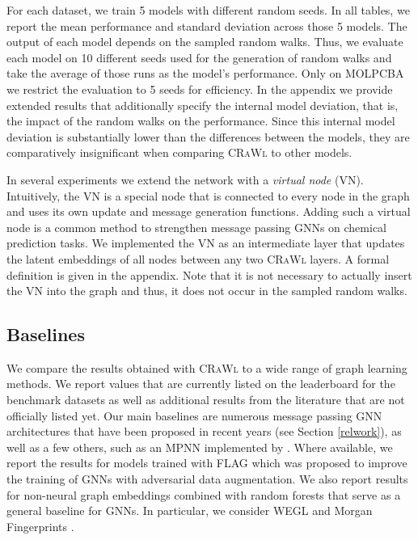 \documentclass{scrartcl} \usepackage[dvipsnames]{xcolor}
\newcommand{\crawl}{\textsc{CRaWl}}
\begin{document}
For each dataset, we train 5 models with different random seeds.
In all tables, we report the mean performance and standard deviation across those 5 models.
The output of each model depends on the sampled random walks.
Thus, we evaluate each model on 10 different seeds used for the generation of random walks and take the average of those runs as the model's performance.
Only on MOLPCBA we restrict the evaluation to 5 seeds for efficiency.
In the appendix we provide extended results that additionally specify the internal model deviation, that is, the impact of the random walks on the performance.
Since this internal model deviation is substantially lower than the differences between the models, they are comparatively insignificant when comparing \crawl{} to other models.




In several experiments we extend the network with a \emph{virtual node} (VN).
Intuitively, the VN is a special node that is connected to every node in the graph and uses its own update and message generation functions.
Adding such a virtual node is a common method to strengthen message passing GNNs on chemical prediction tasks.
We implemented the VN as an intermediate layer that updates the latent embeddings of all nodes between any two \crawl{} layers.
A formal definition is given in the appendix.
Note that it is not necessary to actually insert the VN into the graph and thus, it does not occur in the sampled random walks.


\subsection{Baselines}
We compare the results obtained with \crawl{} to a wide range of graph learning methods.
We report values that are currently listed on the leaderboard for the benchmark datasets as well as additional results from the literature that are not officially listed yet.
Our main baselines are numerous message passing GNN architectures that have been proposed in recent years (see Section \ref{relwork}), as well as a few others, such as an MPNN implemented by \citet{corso2020principal}.
Where available, we report the results for models trained with FLAG \cite{kong2020flag} which was proposed to improve the training of GNNs with adversarial data augmentation.
We also report results for non-neural graph embeddings combined with random forests that serve as a general baseline for GNNs.
In particular, we consider WEGL \cite{kolouri2020wasserstein} and Morgan Fingerprints \cite{doi:10.1021/ci100050t}.
\end{document}
